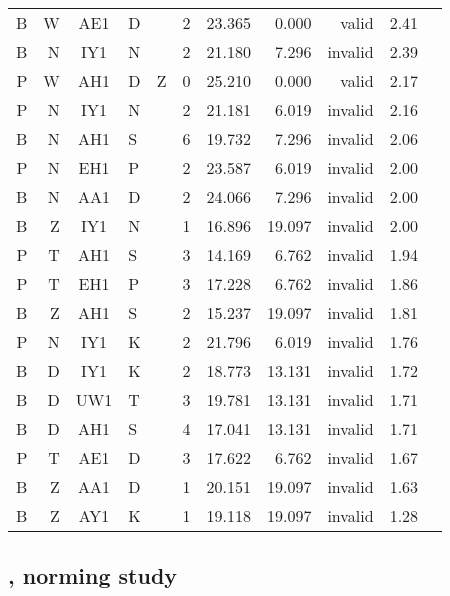 \documentclass[12pt]{article}
\begin{document}
\begin{longtable}{r@{ }r@{ }c@{ }l@{ }l rrrrrr}
B & W & AE1 & D &    & 2 & 23.365 & 0.000 &   valid & 2.41 \\
B & N & IY1 & N &    & 2 & 21.180 & 7.296 & invalid & 2.39 \\
P & W & AH1 & D &  Z & 0 & 25.210 & 0.000 &   valid & 2.17 \\
P & N & IY1 & N &    & 2 & 21.181 & 6.019 & invalid & 2.16 \\
B & N & AH1 & S &    & 6 & 19.732 & 7.296 & invalid & 2.06 \\
P & N & EH1 & P &    & 2 & 23.587 & 6.019 & invalid & 2.00 \\
B & N & AA1 & D &    & 2 & 24.066 & 7.296 & invalid & 2.00 \\
B & Z & IY1 & N &    & 1 & 16.896 & 19.097 & invalid & 2.00 \\
P & T & AH1 & S &    & 3 & 14.169 & 6.762 & invalid & 1.94 \\
P & T & EH1 & P &    & 3 & 17.228 & 6.762 & invalid & 1.86 \\
B & Z & AH1 & S &    & 2 & 15.237 & 19.097 & invalid & 1.81 \\
P & N & IY1 & K &    & 2 & 21.796 & 6.019 & invalid & 1.76 \\
B & D & IY1 & K &    & 2 & 18.773 & 13.131 & invalid & 1.72 \\
B & D & UW1 & T &    & 3 & 19.781 & 13.131 & invalid & 1.71 \\
B & D & AH1 & S &    & 4 & 17.041 & 13.131 & invalid & 1.71 \\
P & T & AE1 & D &    & 3 & 17.622 & 6.762 & invalid & 1.67 \\
B & Z & AA1 & D &    & 1 & 20.151 & 19.097 & invalid & 1.63 \\
B & Z & AY1 & K &    & 1 & 19.118 & 19.097 & invalid & 1.28 \\
\bottomrule
\end{longtable}

\subsection{\citet{Albright2003b}, norming study} 
\end{document}
